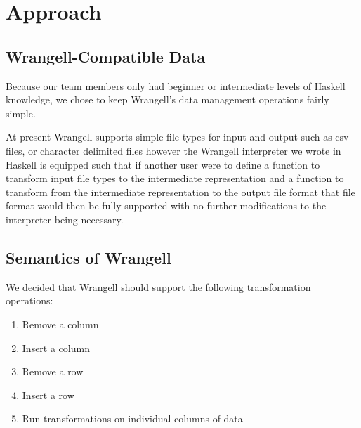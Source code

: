\documentclass[preprint,nocopyrightspace]{sig-alternate}
\begin{document}
\section{Approach}

\subsection{Wrangell-Compatible Data}
Because our team members only had beginner or intermediate levels of Haskell knowledge, we chose to keep Wrangell's data management operations fairly simple. 

\begin{comment}
As a result, Wrangell's application subjects are limited to tables of data wherein columns are separated by either a comma or a user-specified delimiter. Furthermore, we allow the first row of data in a csv file to be a list of comma-separated labels, one for each column. We require that each column have a \emph{unique} label, to avoid ambiguity in potential future Wrangell features which may seek to identify columns per their labels. We decided to ultimately apply Wrangell to a variety of csv files. See Figure \ref{exampleTable} for an example of a Wrangell-compatible data table. 
\end{comment}
At present Wrangell supports simple file types for input and output such as csv files, or character delimited files however the Wrangell interpreter we wrote in Haskell is equipped such that if another user were to define a function to transform input file types to the intermediate representation and a function to transform from the intermediate representation to the output file format that file format would then be fully supported with no further modifications to the interpreter being necessary.


\subsection{Semantics of Wrangell}
We decided that Wrangell should support the following transformation operations:
\begin{enumerate}
\item Remove a column
\item Insert a column
\item Remove a row
\item Insert a row
\item Run transformations on individual columns of data
\end{enumerate}
\end{document}
